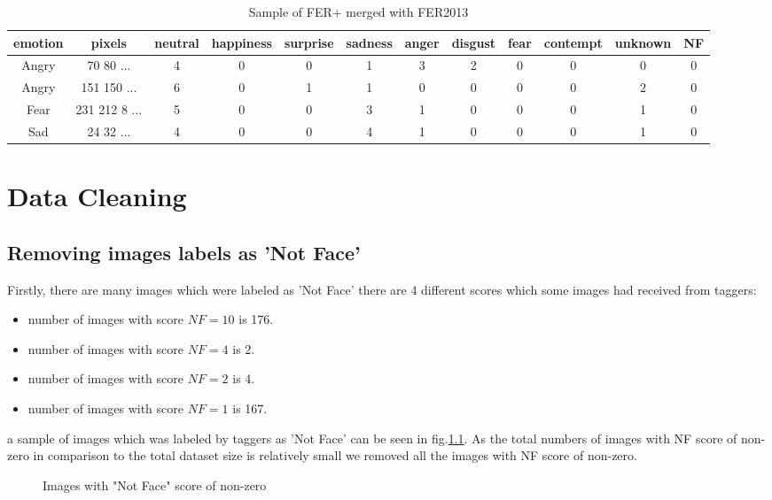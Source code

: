 \documentclass[]{report}
\begin{document}
\begin{table}
	\centering
	\caption{Sample of FER+ merged with FER2013}
	\begin{tabular}{|c|c|c|c|c|c|c|c|c|c|c|c|}
		\hline
emotion &	pixels &	neutral &	happiness &	surprise &	sadness &	anger &	disgust &	fear &	contempt &	unknown &	NF \\ \hline
Angry &	70 80  ... &	4 &	0 &	0 &	1 &	3 &	2 &	0 &	0 &	0 &	0 \\\hline
Angry &	151 150  ... &	6 &	0 &	1 &	1 &	0 &	0 &	0 &	0 &	2 &	0 \\ \hline
Fear &	231 212 8 ... &	5 &	0 &	0 &	3 &	1 &	0 &	0 &	0 &	1 &	0 \\ \hline
Sad &	24 32 ... &	4 &	0 &	0 &	4 &	1 &	0 &	0 &	0 &	1 &	0 \\ \hline
	\end{tabular}
\end{table}


\chapter{Data Cleaning}
\section{Removing images labels as 'Not Face'}
Firstly, there are many images which were labeled as 'Not Face' there are 4 different scores which some images had received from taggers:
\begin{itemize}
	\item number of images with score $NF=10$ is  176.
	\item number of images with score $NF=4$ is  2.
	\item number of images with score $NF=2$ is  4.
	\item number of images with score $NF=1$ is  167.
\end{itemize}
a sample of images which was labeled by taggers as 'Not Face' can be seen in fig.\ref{fig:nf}. As the total numbers of images with NF score of non-zero in comparison to the total dataset size is relatively small we removed all the images with NF score of non-zero. 
\begin{figure}[h]
	\label{fig:nf}
	\centering
	\subfloat[Images with NF=10]{{ }}
	\qquad
	\subfloat[Images with NF=2]{{ }}
	\caption{Images with "Not Face" score of non-zero}
\end{figure}
\end{document}
